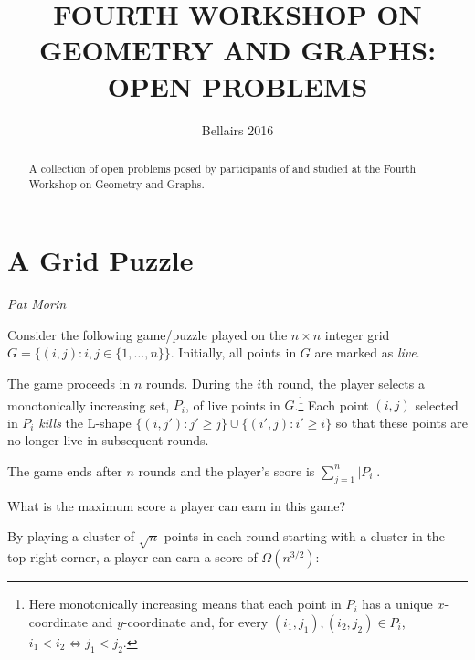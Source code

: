 \documentclass{patmorin}
\title{\MakeUppercase{Fourth Workshop on Geometry and Graphs:
       Open Problems}}
\author{Bellairs 2016}
\begin{document}
\begin{titlepage}
\maketitle

\begin{abstract}
  A collection of open problems posed by participants of and studied at
  the Fourth Workshop on Geometry and Graphs.
\end{abstract}
\end{titlepage}

\tableofcontents
\newpage



\section{A Grid Puzzle}

\noindent\emph{Pat Morin}

Consider the following game/puzzle played on the $n\times n$ integer
grid $G=\{(i,j):i,j\in\{1,\ldots,n\}\}$.  Initially, all points in $G$
are marked as \emph{live}.  

The game proceeds in $n$
rounds. During the $i$th round, the player selects a monotonically
increasing set, $P_i$, of live points in $G$.\footnote{Here monotonically
increasing means that each point in $P_i$ has a unique $x$-coordinate
and $y$-coordinate and, for every $(i_1,j_1),(i_2,j_2)\in P_i$, $i_1 <
i_2\Leftrightarrow j_1<j_2$.}  Each point $(i,j)$ selected in $P_i$
\emph{kills} the L-shape $\{(i,j'): j'\ge j\}\cup\{(i',j):i'\ge i\}$ so 
that these points are no longer live in subsequent rounds. 

The game ends after $n$ rounds and the player's score is $\sum_{j=1}^n |P_i|$.

\begin{op}
   What is the maximum score a player can earn in this game?
\end{op}

By playing a cluster of $\sqrt{n}$ points in each round starting with a cluster
in the top-right corner, a player can earn a score of $\Omega(n^{3/2})$: 
\end{document}
